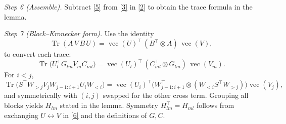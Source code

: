\documentclass{article}
\theoremstyle{definition}
\begin{document}
\medskip
\emph{Step 6 (Assemble).}
Subtract \eqref{5} from \eqref{3} in \eqref{2} to obtain the trace formula in the lemma.

\medskip
\emph{Step 7 (Block–Kronecker form).}
Use the identity
\[
\operatorname{Tr}(A\,V\,B\,U)=\operatorname{vec}(U)^\top\,(B^\top\!\otimes A)\,\operatorname{vec}(V),
\tag{6}
\]
to convert each trace:
\[
\operatorname{Tr}\!\big(U_l^\top G_{lm} V_m C_{ml}\big)
=\operatorname{vec}(U_l)^\top\,(C_{ml}^\top\!\otimes G_{lm})\,\operatorname{vec}(V_m).
\]
For $i<j$,
\[
\operatorname{Tr}\!\big(S^\top W_{>j}V_jW_{j-1:i+1}U_iW_{<i}\big)
=\operatorname{vec}(U_i)^\top\big(W_{j-1:i+1}^\top\!\otimes (W_{<i}S^\top W_{>j})\big)\operatorname{vec}(V_j),
\]
and symmetrically with $(i,j)$ swapped for the other cross term. Grouping all blocks yields $H_{lm}$ stated in the lemma. Symmetry $H_{lm}^\top=H_{ml}$ follows from exchanging $U\leftrightarrow V$ in \eqref{6} and the definitions of $G,C$.
\end{document}
